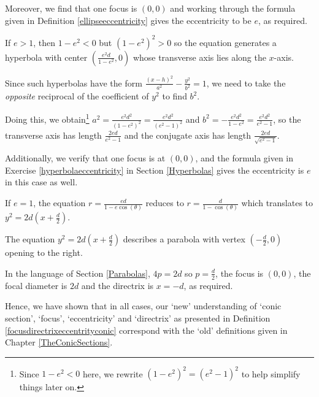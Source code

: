 \documentclass{ximera}
\begin{document}
\smallskip

Moreover, we find that one focus is $(0,0)$ and working through the formula given in  Definition \ref{ellipseeccentricity} gives the eccentricity to be $e$, as required. 

\smallskip

 If $e > 1$, then $1 - e^2 < 0$ but $(1-e^2)^2 > 0$ so the equation generates a hyperbola with center $\left(\frac{e^2 d}{1-e^2}, 0\right)$ whose transverse axis lies along the $x$-axis.  
 
 \smallskip
 
 Since such hyperbolas have the form $\frac{(x-h)^2}{a^2} -\frac{y^2}{b^2} = 1$, we need to take the \textit{opposite} reciprocal of the coefficient of $y^2$ to find $b^2$. 
 
 \smallskip
 
Doing this, we obtain\footnote{ Since $1 - e^2 < 0$ here, we rewrite $\left(1-e^2\right)^2 = \left(e^2-1\right)^2$ to help simplify things later on.}  $a^2 = \frac{e^2 d^2}{\left(1-e^2\right)^2} = \frac{e^2d^2}{\left(e^2-1\right)^2}$ and  $b^2 = -\frac{e^2 d^2}{1-e^2} = \frac{e^2d^2}{e^2-1}$, so the transverse axis has length  $\frac{2ed}{e^2-1}$ and the conjugate axis has length $\frac{2ed}{\sqrt{e^2-1}}$.  
 
 \smallskip
 
 Additionally, we verify that one focus is at $(0,0)$, and the formula given in Exercise \ref{hyperbolaeccentricity} in Section \ref{Hyperbolas} gives  the eccentricity is $e$ in this case as well. 
 
 \smallskip
 
 If $e=1$, the equation $r = \frac{ed}{1-e\cos(\theta)}$ reduces to $r = \frac{d}{1-\cos(\theta)}$ which translates to $y^2 = 2d\left(x + \frac{d}{2}\right)$.   
 
 \smallskip
 
The equation $y^2 = 2d\left(x + \frac{d}{2}\right)$ describes a parabola with vertex $\left(-\frac{d}{2}, 0\right)$ opening to the right.  

\smallskip

In the language of Section \ref{Parabolas}, $4p = 2d$ so $p = \frac{d}{2}$, the focus is $(0,0)$, the focal diameter is $2d$ and the directrix is $x = -d$, as required. 

\smallskip

 Hence, we have shown that in all cases, our `new' understanding  of `conic section', `focus', `eccentricity' and `directrix' as presented in Definition \ref{focusdirectrixeccentrityconic} correspond with the `old' definitions given in Chapter \ref{TheConicSections}. 
 
\end{document}
